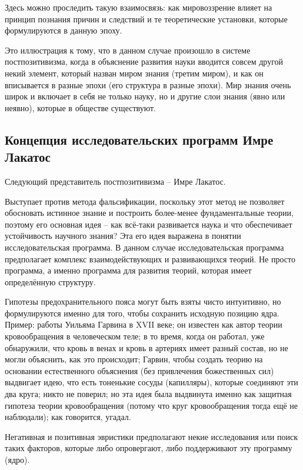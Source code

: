 \documentclass[main.tex]{subfiles}
\begin{document}
Здесь можно проследить такую взаимосвязь: как мировоззрение влияет на принцип познания причин и следствий и те теоретические установки, которые формулируются в данную эпоху.

Это иллюстрация к тому, что в данном случае произошло в системе постпозитивизма, когда в объяснение развития науки вводится совсем другой некий элемент, который назван миром знания (третим миром), и как он вписывается в разные эпохи (его структура в разные эпохи).
Мир знания очень широк и включает в себя не только науку, но и другие слои знания (явно или неявно), которые в обществе существуют.

\subsection{Концепция исследовательских программ Имре Лакатос}


Следующий представитель постпозитивизма -- Имре Лакатос.

Выступает против метода фальсификации, поскольку этот метод не позволяет обосновать истинное знание и построить более-менее фундаментальные теории, поэтому его основная идея -- как всё-таки развивается наука и что обеспечивает устойчивость научного знания?
Эта его идея выражена в понятии исследовательская программа.
В данном случае исследовательская программа предполагает комплекс взаимодействующих и развивающихся теорий.
Не просто программа, а именно программа для развития теорий, которая имеет определённую структуру.

Гипотезы предохранительного пояса могут быть взяты чисто интуитивно, но формулируются именно для того, чтобы сохранить исходную позицию ядра.
Пример: работы Уильяма Гарвина в XVII веке; он известен как автор теории кровообращения в человеческом теле; в то время, когда он работал, уже обнаружили, что кровь в венах и кровь в артериях имеет разный состав, но не могли объяснить, как это происходит; Гарвин, чтобы создать теорию на основании естественного объяснения (без привлечения божественных сил) выдвигает идею, что есть тоненькие сосуды (капилляры), которые соединяют эти два круга; никто не поверил; но эта идея была выдвинута именно как защитная гипотеза теории кровообращения (потому что круг кровообращения тогда ещё не наблюдали); как говорится, угадал.

Негативная и позитивная эвристики предполагают некие исследования или поиск таких факторов, которые либо опровергают, либо поддерживают эту программу (ядро).
\end{document}
